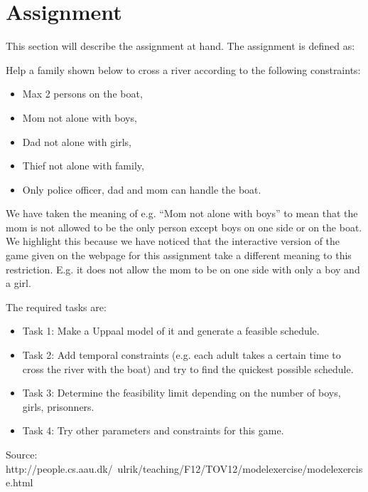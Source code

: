 \section{Assignment}
This section will describe the assignment at hand.
The assignment is defined as:

Help a family shown below to cross a river according to the following constraints:
\begin{itemize}
	\item Max 2 persons on the boat,
	\item Mom not alone with boys,
	\item Dad not alone with girls,
	\item Thief not alone with family,
	\item Only police officer, dad and mom can handle the boat.
\end{itemize}
We have taken the meaning of e.g. ``Mom not alone with boys'' to mean that the mom is not allowed to be the only person except boys on one side or on the boat.
We highlight this because we have noticed that the interactive version of the game given on the webpage for this assignment take a different meaning to this restriction.
E.g. it does not allow the mom to be on one side with only a boy and a girl.

The required tasks are:
\begin{itemize}
	\item Task 1: Make a Uppaal model of it and generate a feasible schedule.
  \item Task 2: Add temporal constraints (e.g. each adult takes a certain time to cross the river with the boat) and try to find the quickest possible schedule.
  \item Task 3: Determine the feasibility limit depending on the number of boys, girls, prisonners.
  \item Task 4: Try other parameters and constraints for this game.
\end{itemize}
Source: http://people.cs.aau.dk/~ulrik/teaching/F12/TOV12/modelexercise/modelexercise.html